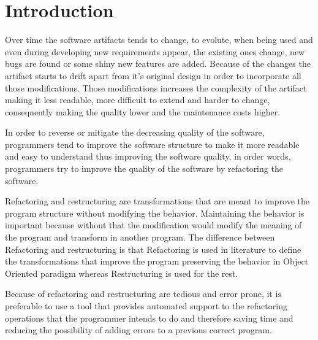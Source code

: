 
% 
% 

\section{Introduction}

Over time the software artifacts tends to change, to evolute, %
 when being used and even during developing new requirements appear, the existing ones change, new bugs are found or some shiny new features are added.
Because of the changes the artifact starts to drift apart from it's original design in order to incorporate all those modifications.
Those modifications increases the complexity of the artifact making it less readable, more difficult to extend and harder to change, consequently making the quality lower and the maintenance costs higher. %


In order to reverse or mitigate the decreasing quality of the software, programmers tend to improve the software structure to make it more readable and easy to understand thus improving the software quality, in order words, programmers try to improve the quality of the software by refactoring the software.

Refactoring and restructuring are transformations that are meant to improve the program structure without modifying the behavior. Maintaining the behavior is important because without that the modification would modify the meaning of the program and transform in another program.
The difference between Refactoring and restructuring is that Refactoring is used in literature to define the transformations that improve the program preserving the behavior in Object Oriented paradigm \cite{opdyke1992refactoring} \cite{fowlerrefactoring1999} whereas Restructuring is used for the rest. \cite{griswold1993automated} \cite{softrest1986} %


Because of refactoring and restructuring are tedious and error prone, it is preferable to use a tool that provides automated support to the refactoring operations that the programmer intends to do and therefore saving time and reducing the possibility of adding errors to a previous correct program.


